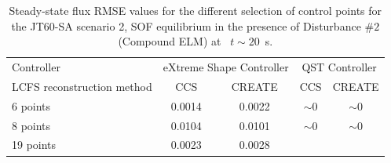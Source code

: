 \begin{table}[]
	\centering
	\begin{tabular}{|l|c|c|c|c|}
		\hline
		\rowcolor{color2}
		\multicolumn{5}{|c|}{\textbf{Disturbance $\#2$ (Compound ELM) flux RMSE steady state      ~ ~ Wb/2$\pi$}}                                                                 \\ \hline
		\rowcolor{color1}
		Controller                 & \multicolumn{2}{c|}{eXtreme Shape Controller} & \multicolumn{2}{c|}{QST Controller}                 \\ \hline
		LCFS reconstruction method & CCS                   & CREATE                & CCS                      & CREATE                   \\ \hline
		6 points                   & 0.0014                & 0.0022                & $\sim 0$               & $\sim 0$                  \\ \hline
		8 points                   & 0.0104                & 0.0101                & $\sim 0$                 & $\sim 0$                  \\ \hline
		19 points                  & 0.0023                & 0.0028                & \cellcolor[HTML]{C0C0C0} & \cellcolor[HTML]{C0C0C0} \\ \hline
	\end{tabular}
	\caption{Steady-state flux RMSE values for the different selection of control points for  the JT60-SA scenario 2, SOF equilibrium in the presence of  Disturbance $\# 2$ (Compound ELM) at ~$t\sim 20 $~s. }
	\label{fluxRMSE_cmpELM_table}
\end{table}

